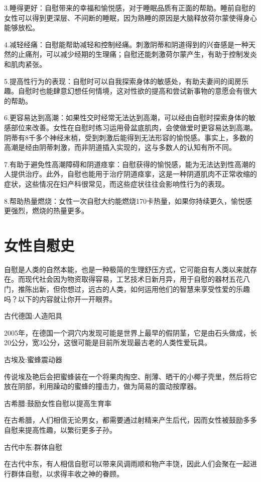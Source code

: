 \documentclass[12pt,UTF8]{ctexbook}
\begin{document}
3.睡得更好：自慰带来的幸福和愉悦感，对于睡眠品质有正面的帮助。睡前自慰的女性可以得到更深层、不间断的睡眠，因为熟睡的原因是大脑释放荷尔蒙使得身心能够放松。

4.减轻经痛：自慰能帮助减轻和控制经痛。刺激阴蒂和阴道得到的兴奋感是一种天然的止痛剂，可以减少经期的生理痛；自慰还能刺激荷尔蒙产生，有助于控制发炎和肌肉紧张。

5.提高性行为的表现：自慰时可以自我探索身体的敏感处，有助夫妻间的闺房乐趣。自慰时也能肆意幻想任何情境，这对性欲的提高和尝试新事物的意愿会有很大的帮助。

6.更容易达到高潮：如果性交时经常无法达到高潮，可以经由自慰时探索身体的敏感部位来改善。女性在自慰时练习运用骨盆底肌肉，会使做爱时更容易达到高潮。阴蒂有8千多个神经末梢，受到刺激后能得到无法形容的愉悦感。事实上，多数的高潮是经由阴蒂刺激，而非阴道插入实现的，这与多数人的认知有所不同。

7.有助于避免性高潮障碍和阴道痉挛：自慰获得的愉悦感，能为无法达到性高潮的人提供治疗。此外，自慰也能用于治疗阴道痉挛，这是一种阴道肌肉不正常收缩的症状，这些情况在妇产科很常见，而这些症状往往会影响性行为的表现。

8.帮助热量燃烧：女性一次自慰大约能燃烧170卡热量，如果你持续更久，愉悦感更强烈，燃烧的热量更多。

\section{女性自慰史}

自慰是人类的自然本能，也是一种极简的生理舒压方式，它可能自有人类以来就存在。而现代社会因为物资取得容易，工艺技术日新月异，用于自慰的器材五花八门，推陈出新，但你想过，远古的人类，如何运用他们的智慧来享受性爱的乐趣吗？以下的内容就让你开一开眼界。

古代德国:人造阳具

2005年，在德国一个洞穴内发现可能是世界上最早的假阴茎，它是由石头做成，长20公分，宽3公分，这很可能是目前所发现最古老的人类性爱玩具。

古埃及:蜜蜂震动器

传说埃及艳后会把蜜蜂装在一个将果肉掏空、削薄、晒干的小椰子壳里，然后将它放在阴部，利用躁动的蜜蜂的撞击力，做为简易的震动按摩器。

古希腊:鼓励女性自慰以提高生育率

在古希腊，人们相信无论男女，都需要通过射精来产生后代，因而女性被鼓励多多自慰来提高性趣，以繁衍更多子孙。

古代中东:群体自慰

在古代中东，有人相信自慰可以带来风调雨顺和物产丰饶，因此人们会聚在一起进行群体自慰，以求得丰收之神的眷顾。
\end{document}
